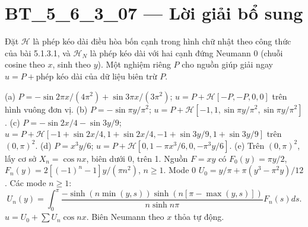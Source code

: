 \documentclass[10pt,a4paper]{article}
\begin{document}
\section*{BT\_5\_6\_3\_07 — Lời giải bổ sung}
Đặt $\mathcal H$ là phép kéo dài điều hòa bốn cạnh trong hình chữ nhật theo công thức của bài 5.1.3.1, và $\mathcal H_N$ là phép kéo dài với hai cạnh đứng Neumann 0 (chuỗi cosine theo $x$, sinh theo $y$). Một nghiệm riêng $P$ cho nguồn giúp giải ngay $u=P+$phép kéo dài của dữ liệu biên trừ $P$.

(a) $P=-\sin2\pi x/(4\pi^2)+\sin3\pi x/(3\pi^2)$; $u=P+\mathcal H[-P,-P,0,0]$ trên hình vuông đơn vị.
(b) $P=-\sin\pi y/\pi^2$; $u=P+\mathcal H[-1,1,\sin\pi y/\pi^2,\sin\pi y/\pi^2]$.
(c) $P=-\sin2x/4-\sin3y/9$; $u=P+\mathcal H[-1+\sin2x/4,1+\sin2x/4,-1+\sin3y/9,1+\sin3y/9]$ trên $(0,\pi)^2$.
(d) $P=x^3y/6$; $u=P+\mathcal H[0,1-\pi x^3/6,0,-\pi^3y/6]$.
(e) Trên $(0,\pi)^2$, lấy cơ sở $X_n=\cos nx$, biên dưới 0, trên 1. Nguồn $F=xy$ có $F_0(y)=\pi y/2$, $F_n(y)=2[(-1)^n-1]y/(\pi n^2)$, $n\ge1$. Mode 0 $U_0=y/\pi+\pi(y^3-\pi^2y)/12$. Các mode $n\ge1$:
\[U_n(y)=\int_0^\pi\frac{-\sinh(n\min(y,s))\sinh(n[\pi-\max(y,s)])}{n\sinh n\pi}F_n(s)ds.\]
$u=U_0+\sum U_n\cos nx$. Biên Neumann theo $x$ thỏa tự động.
\end{document}
